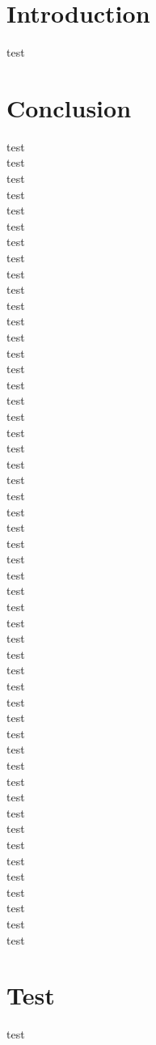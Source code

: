 \documentclass[a4j, 11pt, twocolumn, uplatex]{jsarticle}
\begin{document}

\section{Introduction}
test

\newpage
\section{Conclusion}
test \\
test \\
test \\
test \\
test \\
test \\
test \\
test \\
test \\
test \\
test \\
test \\
test \\
test \\
test \\
test \\
test \\
test \\
test \\
test \\
test \\
test \\
test \\
test \\
test \\
test \\
test \\
test \\
test \\
test \\
test \\
test \\
test \\
test \\
test \\
test \\
test \\
test \\
test \\
test \\
test \\
test \\
test \\
test \\
test \\
test \\
test \\
test \\
test \\
test \\
test \\

\newpage
\section{Test}
test
\end{document}
